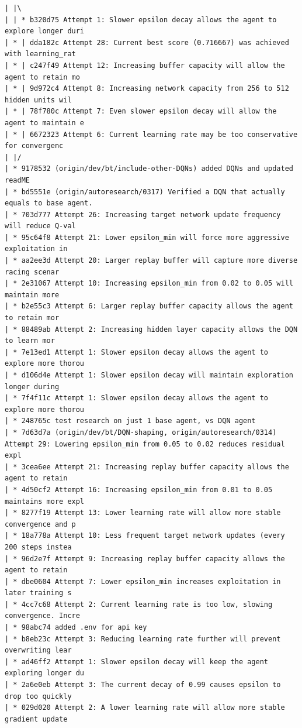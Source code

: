 \begin{appendices}
\begin{small}
\begin{verbatim}
| |\  
| | * b320d75 Attempt 1: Slower epsilon decay allows the agent to explore longer duri
| * | dda182c Attempt 28: Current best score (0.716667) was achieved with learning_rat
| * | c247f49 Attempt 12: Increasing buffer capacity will allow the agent to retain mo
| * | 9d972c4 Attempt 8: Increasing network capacity from 256 to 512 hidden units wil
| * | 78f780c Attempt 7: Even slower epsilon decay will allow the agent to maintain e
| * | 6672323 Attempt 6: Current learning rate may be too conservative for convergenc
| |/  
| * 9178532 (origin/dev/bt/include-other-DQNs) added DQNs and updated readME
| * bd5551e (origin/autoresearch/0317) Verified a DQN that actually equals to base agent.
| * 703d777 Attempt 26: Increasing target network update frequency will reduce Q-val
| * 95c64f8 Attempt 21: Lower epsilon_min will force more aggressive exploitation in
| * aa2ee3d Attempt 20: Larger replay buffer will capture more diverse racing scenar
| * 2e31067 Attempt 10: Increasing epsilon_min from 0.02 to 0.05 will maintain more
| * b2e55c3 Attempt 6: Larger replay buffer capacity allows the agent to retain mor
| * 88489ab Attempt 2: Increasing hidden layer capacity allows the DQN to learn mor
| * 7e13ed1 Attempt 1: Slower epsilon decay allows the agent to explore more thorou
| * d106d4e Attempt 1: Slower epsilon decay will maintain exploration longer during
| * 7f4f11c Attempt 1: Slower epsilon decay allows the agent to explore more thorou
| * 248765c test research on just 1 base agent, vs DQN agent
| * 7d63d7a (origin/dev/bt/DQN-shaping, origin/autoresearch/0314) Attempt 29: Lowering epsilon_min from 0.05 to 0.02 reduces residual expl
| * 3cea6ee Attempt 21: Increasing replay buffer capacity allows the agent to retain
| * 4d50cf2 Attempt 16: Increasing epsilon_min from 0.01 to 0.05 maintains more expl
| * 8277f19 Attempt 13: Lower learning rate will allow more stable convergence and p
| * 18a778a Attempt 10: Less frequent target network updates (every 200 steps instea
| * 96d2e7f Attempt 9: Increasing replay buffer capacity allows the agent to retain
| * dbe0604 Attempt 7: Lower epsilon_min increases exploitation in later training s
| * 4cc7c68 Attempt 2: Current learning rate is too low, slowing convergence. Incre
| * 98abc74 added .env for api key
| * b8eb23c Attempt 3: Reducing learning rate further will prevent overwriting lear
| * ad46ff2 Attempt 1: Slower epsilon decay will keep the agent exploring longer du
| * 2a6e0eb Attempt 3: The current decay of 0.99 causes epsilon to drop too quickly
| * 029d020 Attempt 2: A lower learning rate will allow more stable gradient update

\end{verbatim}
\end{small}
\end{appendices}
